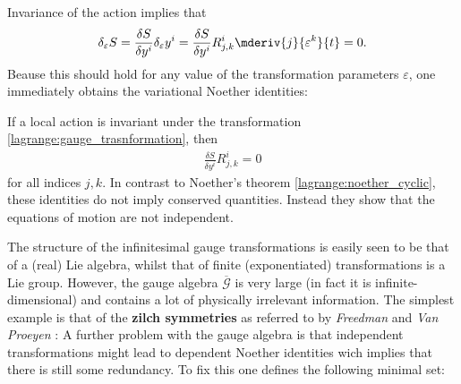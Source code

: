     Invariance of the action implies that
    \begin{gather}
        \delta_\varepsilon S = \frac{\delta S}{\delta y^i}\delta_\varepsilon y^i = \frac{\delta S}{\delta y^i}R^i_{j,k}\mderiv{j}{\varepsilon^k}{t} = 0.
    \end{gather}
    Beause this should hold for any value of the transformation parameters $\varepsilon$, one immediately obtains the variational Noether identities:
    \begin{property}
        If a local action is invariant under the transformation \ref{lagrange:gauge_trasnformation}, then
        \begin{gather}
            \frac{\delta S}{\delta y^i}R^i_{j,k} = 0
        \end{gather}
        for all indices $j,k$. In contrast to Noether's theorem \ref{lagrange:noether_cyclic}, these identities do not imply conserved quantities. Instead they show that the equations of motion are not independent.
    \end{property}
    The structure of the infinitesimal gauge transformations is easily seen to be that of a (real) Lie algebra, whilst that of finite (exponentiated) transformations is a Lie group. However, the gauge algebra $\overline{\mathcal{G}}$ is very large (in fact it is infinite-dimensional) and contains a lot of physically irrelevant information. The simplest example is that of the \textbf{zilch symmetries} as referred to by \textit{Freedman} and \textit{Van Proeyen} \cite{supergravity}:
    A further problem with the gauge algebra is that independent transformations might lead to dependent Noether identities wich implies that there is still some redundancy. To fix this one defines the following minimal set:
